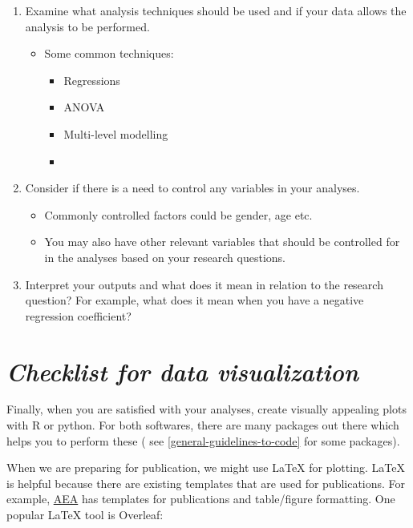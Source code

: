 \documentclass[
]{book}
\providecommand{\tightlist}{%
  \setlength{\itemsep}{0pt}\setlength{\parskip}{0pt}}
\begin{document}
\begin{enumerate}
\def\labelenumi{\arabic{enumi}.}
\tightlist
\item
  Examine what analysis techniques should be used and if your data allows the analysis to be performed.

  \begin{itemize}
  \item
    Some common techniques:

    \begin{itemize}
    \item
      Regressions
    \item
      ANOVA
    \item
      Multi-level modelling
    \item
    \end{itemize}
  \end{itemize}
\item
  Consider if there is a need to control any variables in your analyses.

  \begin{itemize}
  \tightlist
  \item
    Commonly controlled factors could be gender, age etc.
  \item
    You may also have other relevant variables that should be controlled for in the analyses based on your research questions.
  \end{itemize}
\item
  Interpret your outputs and what does it mean in relation to the research question? For example, what does it mean when you have a negative regression coefficient?
\end{enumerate}

\hypertarget{checklist-for-data-visualization}{%
\section{\texorpdfstring{\emph{Checklist for data visualization}}{Checklist for data visualization}}\label{checklist-for-data-visualization}}

Finally, when you are satisfied with your analyses, create visually appealing plots with R or python. For both softwares, there are many packages out there which helps you to perform these ( see \ref{general-guidelines-to-code} for some packages).

When we are preparing for publication, we might use LaTeX for plotting. LaTeX is helpful because there are existing templates that are used for publications. For example, \href{https://www.aeaweb.org/journals/aej/styleguide}{AEA} has templates for publications and table/figure formatting. One popular LaTeX tool is Overleaf:
\end{document}
